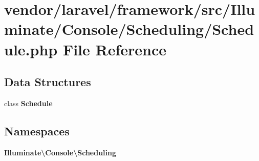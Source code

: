 \section{vendor/laravel/framework/src/\+Illuminate/\+Console/\+Scheduling/\+Schedule.php File Reference}
\label{_schedule_8php}
\subsection*{Data Structures}
\begin{DoxyCompactItemize}
\item 
class {\bf Schedule}
\end{DoxyCompactItemize}
\subsection*{Namespaces}
\begin{DoxyCompactItemize}
\item 
 {\bf Illuminate\textbackslash{}\+Console\textbackslash{}\+Scheduling}
\end{DoxyCompactItemize}
